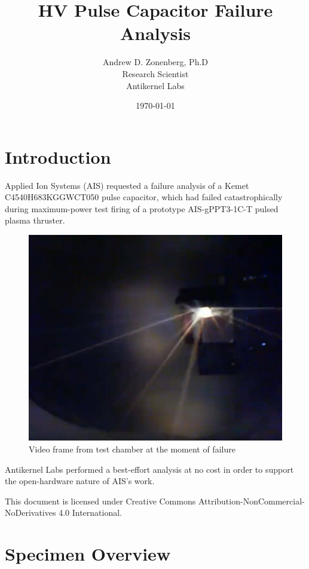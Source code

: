 \documentclass{article}
\begin{document}
\title{HV Pulse Capacitor Failure Analysis }
\author {Andrew D. Zonenberg, Ph.D \\ Research Scientist \\ Antikernel Labs}
\date{\today}
\maketitle

\section{Introduction}

Applied Ion Systems (AIS) requested a failure analysis of a Kemet C4540H683KGGWCT050 pulse capacitor, which had failed
catastrophically during maximum-power test firing of a prototype AIS-gPPT3-1C-T pulsed plasma thruster.

\begin{figure}[h]
\includegraphics[scale=0.35]{cap-failure.jpg}
\caption{Video frame from test chamber at the moment of failure}
\label{failure}
\end{figure}

Antikernel Labs performed a best-effort analysis at no cost in order to support the open-hardware nature of AIS's work.

This document is licensed under Creative Commons Attribution-NonCommercial-NoDerivatives 4.0 International.

\pagebreak
\section{Specimen Overview}
\end{document}
